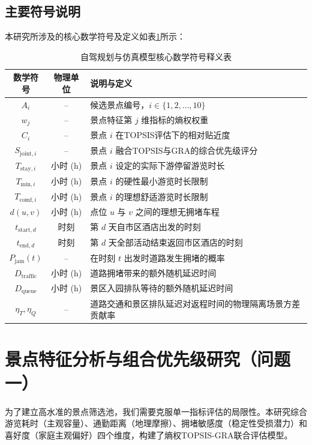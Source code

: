 \documentclass{cumcmthesis}
\begin{document}
\subsection{主要符号说明}
本研究所涉及的核心数学符号及定义如表\ref{tab:symbols}所示：
\begin{table}[htbp]
\centering
\caption{自驾规划与仿真模型核心数学符号释义表}
\label{tab:symbols}
\small
\begin{tabular}{ccl}
\toprule
数学符号 & 物理单位 & 说明与定义 \\
\midrule
$A_i$ & -- & 候选景点编号，$i \in \{1, 2, \dots, 10\}$ \\
$w_j$ & -- & 景点特征第 $j$ 维指标的熵权权重 \\
$C_i$ & -- & 景点 $i$ 在TOPSIS评估下的相对贴近度 \\
$S_{\text{joint}, i}$ & -- & 景点 $i$ 融合TOPSIS与GRA的综合优先级评分 \\
$T_{\text{stay}, i}$ & 小时 (h) & 景点 $i$ 设定的实际下游停留游览时长 \\
$T_{\text{min}, i}$ & 小时 (h) & 景点 $i$ 的硬性最小游览时长限制 \\
$T_{\text{comf}, i}$ & 小时 (h) & 景点 $i$ 的理想舒适游览时长限制 \\
$d(u, v)$ & 小时 (h) & 点位 $u$ 与 $v$ 之间的理想无拥堵车程 \\
$t_{\text{start}, d}$ & 时刻 & 第 $d$ 天自市区酒店出发的时刻 \\
$t_{\text{end}, d}$ & 时刻 & 第 $d$ 天全部活动结束返回市区酒店的时刻 \\
$P_{\text{jam}}(t)$ & -- & 在时刻 $t$ 出发时道路发生拥堵的概率 \\
$D_{\text{traffic}}$ & 小时 (h) & 道路拥堵带来的额外随机延迟时间 \\
$D_{\text{queue}}$ & 小时 (h) & 景区入园排队等待的额外随机延迟时间 \\
$\eta_T, \eta_Q$ & -- & 道路交通和景区排队延迟对返程时间的物理隔离场景方差贡献率 \\
\bottomrule
\end{tabular}
\end{table}
\section{景点特征分析与组合优先级研究（问题一）}
为了建立高水准的景点筛选池，我们需要克服单一指标评估的局限性。本研究综合游览耗时（主观容量）、通勤距离（地理摩擦）、拥堵敏感度（稳定性受损潜力）和喜好度（家庭主观偏好）四个维度，构建了熵权TOPSIS-GRA联合评估模型。
\end{document}
